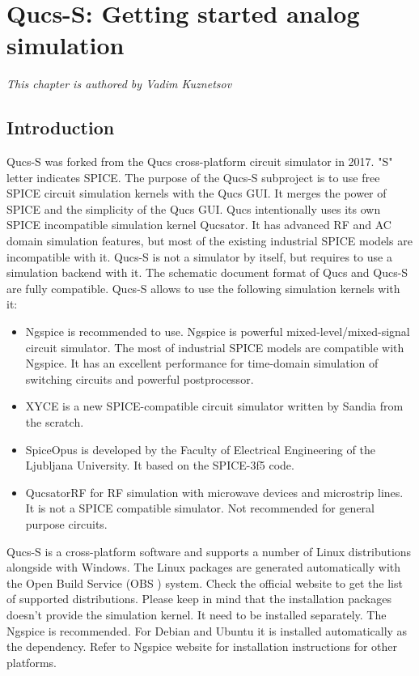 \chapter{Qucs-S: Getting started analog simulation}

\hfill\textsl{This chapter is authored by Vadim Kuznetsov}

\section{Introduction} \label{sec:intro}

Qucs-S was forked from the Qucs cross-platform circuit simulator in 2017. "S" letter indicates SPICE. The purpose of the Qucs-S subproject is to use free SPICE circuit simulation kernels with the Qucs GUI. It merges the power of SPICE and the simplicity of the Qucs GUI. Qucs intentionally uses its own SPICE incompatible simulation kernel Qucsator. It has advanced RF and AC domain simulation features, but most of the existing industrial SPICE models are incompatible with it. Qucs-S is not a simulator by itself, but requires to use a simulation backend with it. The schematic document format of Qucs and Qucs-S are fully compatible. Qucs-S allows to use the following simulation kernels with it:

\begin{itemize}
 \item  Ngspice is recommended to use. Ngspice is powerful mixed-level/mixed-signal circuit simulator. The most of industrial SPICE models are compatible with Ngspice. It has an excellent performance for time-domain simulation of switching circuits and powerful postprocessor.
 \item XYCE is a new SPICE-compatible circuit simulator written by Sandia from the scratch.
 \item SpiceOpus is developed by the Faculty of Electrical Engineering of the Ljubljana University. It based on the SPICE-3f5 code.
 \item QucsatorRF for RF simulation with microwave devices and microstrip lines. It is not a SPICE compatible simulator. Not recommended for general purpose circuits.
\end{itemize}

Qucs-S is a cross-platform software and supports a number of Linux distributions alongside with Windows\texttrademark. The Linux packages are generated automatically with the Open Build Service (OBS ) system. Check the official website to get the list of supported distributions. Please keep in mind that the installation packages doesn't provide the simulation kernel. It need to be installed separately. The Ngspice is recommended. For Debian and Ubuntu it is installed automatically as the dependency. Refer to Ngspice website for installation instructions for other platforms.

